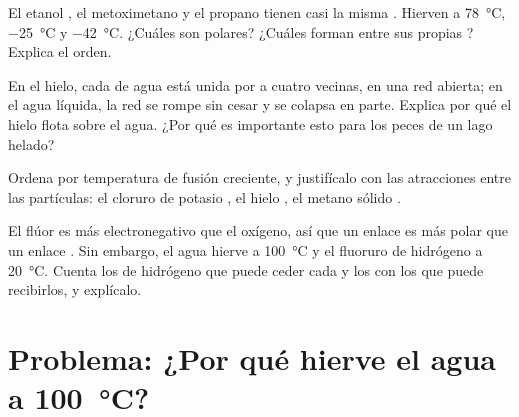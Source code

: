 \begin{exercise}[$\star\star\star$]\label{exo:g11:polarity-and-cohesion:12}
El etanol , el metoximetano  y el propano
 tienen casi la misma . Hierven a
\qty{78}{\celsius}, \qty{-25}{\celsius} y \qty{-42}{\celsius}. ¿Cuáles
son polares? ¿Cuáles forman  entre sus propias
? Explica el orden.
\end{exercise}

\begin{exercise}[$\star\star\star$]\label{exo:g11:polarity-and-cohesion:13}
En el hielo, cada  de agua está unida por  a
cuatro vecinas, en una red abierta; en el agua líquida, la red se rompe
sin cesar y se colapsa en parte. Explica por qué el hielo flota sobre el
agua. ¿Por qué es importante esto para los peces de un lago helado?
\end{exercise}

\begin{exercise}[$\star\star\star$]\label{exo:g11:polarity-and-cohesion:14}
Ordena por temperatura de fusión creciente, y justifícalo con las
atracciones entre las partículas: el cloruro de potasio , el
hielo , el metano sólido .
\end{exercise}

\begin{exercise}[$\star\star\star$]\label{exo:g11:polarity-and-cohesion:15}
El flúor es más electronegativo que el oxígeno, así que un enlace
 es más polar que un enlace . Sin embargo, el agua
hierve a \qty{100}{\celsius} y el fluoruro de hidrógeno a
\qty{20}{\celsius}. Cuenta los  de hidrógeno que puede ceder cada
 y los  con los que puede recibirlos, y
explícalo.
\end{exercise}

\section{Problema: ¿Por qué hierve el agua a \texorpdfstring{\qty{100}{\celsius}}{100 grados Celsius}?}

